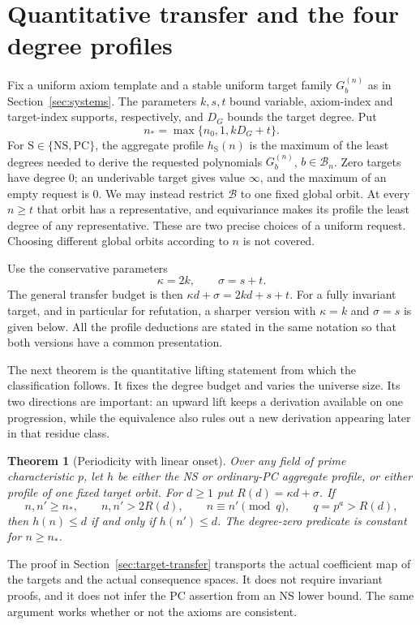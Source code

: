 \documentclass[11pt,a4paper]{article}
\newtheorem{theorem}{Theorem}[section]
\theoremstyle{definition}\newtheorem{definition}[theorem]{Definition}
\theoremstyle{remark}\newtheorem{remark}[theorem]{Remark}
\newcommand{\NS}{\mathrm{NS}}\newcommand{\PC}{\mathrm{PC}}
\begin{document}
\section{Quantitative transfer and the four degree profiles}\label{sec:classification}
Fix a uniform axiom template and a stable uniform target family
$G_b^{(n)}$ as in Section~\ref{sec:systems}. The parameters $k,s,t$ bound
variable, axiom-index and target-index supports, respectively, and $D_G$
bounds the target degree. Put
\[
                 n_* = \max\{n_0,1,kD_G+t\}.
\]
For $\mathrm S\in\{\NS,\PC\}$, the aggregate profile $h_{\mathrm S}(n)$
is the maximum of the least degrees needed to derive the requested
polynomials $G_b^{(n)}$, $b\in\mathcal B_n$. Zero targets have degree $0$;
an underivable target gives value $\infty$, and the maximum of an empty
request is $0$. We may instead
restrict $\mathcal B$ to one fixed global orbit. At every $n\ge t$ that
orbit has a representative, and equivariance makes its profile the least
degree of any representative. These are two precise choices of a uniform
request. Choosing different global orbits according to $n$ is not covered.

Use the conservative parameters
\begin{equation}\label{eq:profile-parameters}
                      \kappa=2k,\qquad \sigma=s+t.
\end{equation}
The general transfer budget is then $\kappa d+\sigma=2kd+s+t$.
For a fully invariant target, and in particular for refutation, a sharper
version with $\kappa=k$ and $\sigma=s$ is given below. All the profile
deductions are stated in the same notation so that both versions have a
common presentation.

The next theorem is the quantitative lifting statement from which
the classification follows. It fixes the degree budget and varies the
universe size. Its two directions are important: an upward lift keeps
a derivation available on one progression, while the equivalence also
rules out a new derivation appearing later in that residue class.

\begin{theorem}[Periodicity with linear onset]\label{thm:periodicity}
Over any field of prime characteristic $p$, let $h$ be either the NS or
ordinary-PC aggregate profile, or either profile of one fixed target
orbit. For $d\ge1$ put $R(d)=\kappa d+\sigma$. If
\[
 n,n'\ge n_*,\qquad n,n'>2R(d),\qquad
 n\equiv n'\pmod q,\qquad q=p^a>R(d),
\]
then $h(n)\le d$ if and only if $h(n')\le d$. The degree-zero predicate
is constant for $n\ge n_*$.
\end{theorem}
The proof in Section~\ref{sec:target-transfer} transports the actual
coefficient map of the targets and the actual consequence spaces. It does
not require invariant proofs, and it does not infer the PC assertion from
an NS lower bound. The same argument works whether or not the axioms are
consistent.
\end{document}
